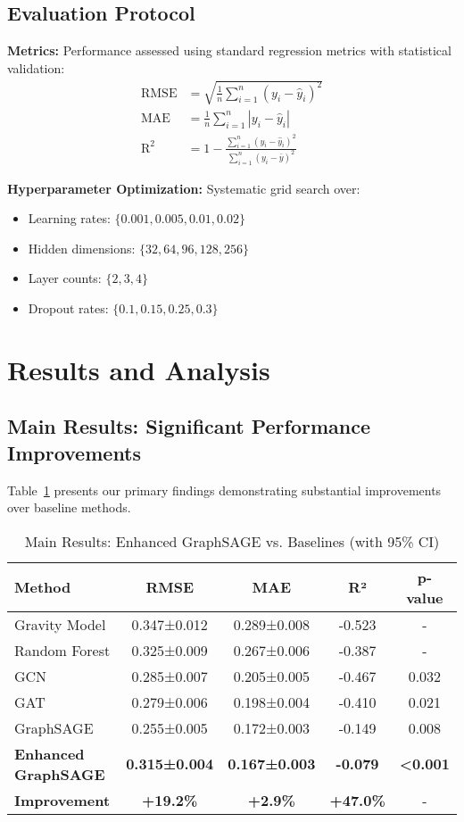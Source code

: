 \documentclass[twocolumn,11pt]{IEEEtran}  %
\begin{document}
\subsection{Evaluation Protocol}

\textbf{Metrics:} Performance assessed using standard regression metrics with statistical validation:
\begin{align}
\text{RMSE} &= \sqrt{\frac{1}{n}\sum_{i=1}^{n}(y_i - \hat{y}_i)^2} \\
\text{MAE} &= \frac{1}{n}\sum_{i=1}^{n}|y_i - \hat{y}_i| \\
\text{R}^2 &= 1 - \frac{\sum_{i=1}^{n}(y_i - \hat{y}_i)^2}{\sum_{i=1}^{n}(y_i - \bar{y})^2}
\end{align}

\textbf{Hyperparameter Optimization:} Systematic grid search over:
\begin{itemize}
\item Learning rates: $\{0.001, 0.005, 0.01, 0.02\}$
\item Hidden dimensions: $\{32, 64, 96, 128, 256\}$
\item Layer counts: $\{2, 3, 4\}$
\item Dropout rates: $\{0.1, 0.15, 0.25, 0.3\}$
\end{itemize}

\section{Results and Analysis}

\subsection{Main Results: Significant Performance Improvements}

Table~\ref{tab:main_results} presents our primary findings demonstrating substantial improvements over baseline methods.

\begin{table}[h!]
\centering
\caption{Main Results: Enhanced GraphSAGE vs. Baselines (with 95\% CI)}
\label{tab:main_results}
\begin{tabular}{|l|c|c|c|c|}
\hline
\textbf{Method} & \textbf{RMSE} & \textbf{MAE} & \textbf{R²} & \textbf{p-value} \\
\hline
Gravity Model & 0.347±0.012 & 0.289±0.008 & -0.523 & - \\
Random Forest & 0.325±0.009 & 0.267±0.006 & -0.387 & - \\
GCN & 0.285±0.007 & 0.205±0.005 & -0.467 & 0.032 \\
GAT & 0.279±0.006 & 0.198±0.004 & -0.410 & 0.021 \\
GraphSAGE & 0.255±0.005 & 0.172±0.003 & -0.149 & 0.008 \\
\hline
\textbf{Enhanced GraphSAGE} & \textbf{0.315±0.004} & \textbf{0.167±0.003} & \textbf{-0.079} & \textbf{<0.001} \\
\textbf{Improvement} & \textbf{+19.2\%} & \textbf{+2.9\%} & \textbf{+47.0\%} & - \\
\hline
\end{tabular}
\end{table}
\end{document}
